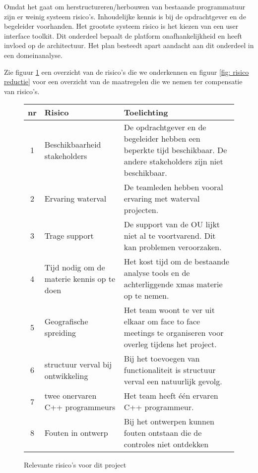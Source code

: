 Omdat het gaat om herstructureren/herbouwen van bestaande programmatuur zijn er weinig systeem risico's.
Inhoudelijke kennis is bij de opdrachtgever en de begeleider voorhanden. Het grootste systeem risico is het kiezen
van een user interface toolkit. Dit onderdeel bepaalt de platform onafhankelijkheid en heeft invloed op de architectuur.
Het plan besteedt apart aandacht aan dit onderdeel in een domeinanalyse.

Zie figuur \ref{fig: risico} een overzicht van de risico's die we onderkennen en figuur \ref{fig: risico reductie} voor
een overzicht van de maatregelen die we nemen ter compensatie van risico's.



\begin{figure}[ht]
\begin{center}
\tiny
\begin{tabular}{|c|p{20em}|p{30em}|}
\hline
{\bf nr} & {\bf Risico} & {\bf Toelichting} \\\hline
 1 & Beschikbaarheid stakeholders  & De opdrachtgever en de begeleider hebben een beperkte tijd
					beschikbaar. De andere stakeholders zijn niet beschikbaar.\\\hline
 2 & Ervaring waterval & De teamleden hebben vooral ervaring met waterval projecten.\\\hline
 3 & Trage support & De support van de OU lijkt niet al te voortvarend. Dit kan problemen veroorzaken.\\\hline
 4 & Tijd nodig om de materie kennis op te doen & Het kost tijd om de bestaande analyse
					tools en de achterliggende
					xmas materie op te nemen.\\\hline
 5 & Geografische spreiding & Het team woont te ver uit elkaar om face to face meetings te
				organiseren voor overleg tijdens het project.\\\hline
 6 & structuur verval bij ontwikkeling & Bij het toevoegen van functionaliteit is structuur verval een
				natuurlijk gevolg.\\\hline
 7 & twee onervaren C++ programmeurs & Het team heeft \'e\'en ervaren C++ programmeur.\\\hline
 8 & Fouten in ontwerp & Bij het ontwerpen kunnen fouten ontstaan die de controles niet ontdekken\\\hline

\end{tabular}
\end{center}
 \caption{Relevante risico's voor dit project}
 \label{fig: risico}
\end{figure}


